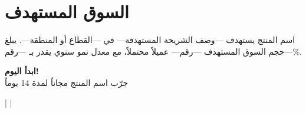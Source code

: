\documentclass[11pt,a4paper]{article}
\begin{document}
\vspace{0.5em}

\section{السوق المستهدف}
اسم المنتج يستهدف ---وصف الشريحة المستهدفة--- في%
---القطاع أو المنطقة---. يبلغ حجم السوق المستهدف%
---رقم--- عميلاً محتملاً، مع معدل نمو سنوي يقدر بـ%
---رقم---\%.

\vspace{0.4em}

\begin{ctabox}
\begin{center}
{\Large\bfseries ابدأ اليوم!}\\[0.3em]
{\small جرّب اسم المنتج مجاناً لمدة 14 يوماً}
\end{center}
\vspace{0.3em}
\begin{center}
 \quad|\quad%
 \quad|\quad%
\end{center}
\end{ctabox}
\end{document}

